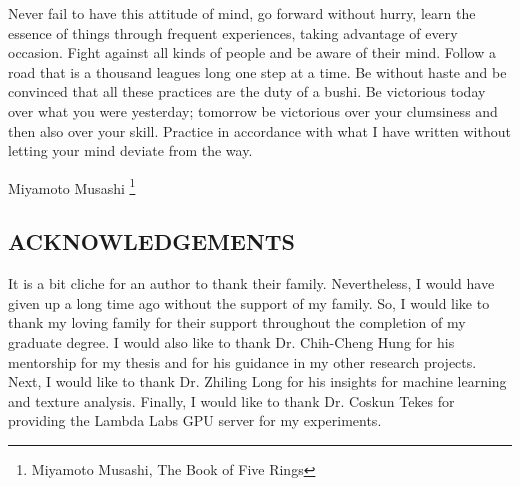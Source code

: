 \documentclass[12pt]{article}
\newcommand{\toppage}{\vspace*{0.3in}}
\begin{document}
\toppage
Never fail to have this attitude of mind, go forward without hurry, learn the
essence of things through frequent experiences, taking advantage of every
occasion. Fight against all kinds of people and be aware of their mind. Follow a
road that is a thousand leagues long one step at a time. Be without haste and be
convinced that all these practices are the duty of a bushi. Be victorious today
over what you were yesterday; tomorrow be victorious over your clumsiness and
then also over your skill. Practice in accordance with what I have written
without letting your mind deviate from the way.

\vspace{0.5in}
\hspace*{\fill} Miyamoto Musashi \footnote{Miyamoto Musashi, The Book of Five
    Rings}
\newpage

\toppage
\begin{center}
    \section*{ACKNOWLEDGEMENTS}
\end{center}
\vspace{0.5in}

\noindent It is a bit cliche for an author to thank their family. Nevertheless,
I would have given up a long time ago without the support of my family. So, I
would like to thank my loving family for their support throughout the completion
of my graduate degree. I would also like to thank Dr. Chih-Cheng Hung for his
mentorship for my thesis and for his guidance in my other research projects.
Next, I would like to thank Dr. Zhiling Long for his insights for machine
learning and texture analysis. Finally, I would like to thank Dr. Coskun Tekes
for providing the Lambda Labs GPU server for my experiments.
\newpage

\begin{center}
    \tableofcontents
\end{center}
\newpage

\begin{center}
    \listoffigures
\end{center}
\newpage
\end{document}

